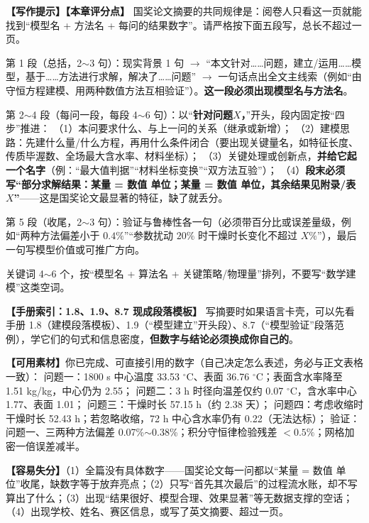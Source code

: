 \documentclass[12pt,a4paper]{article}
\newcommand{\prompt}[1]{\par\noindent\textbf{【写作提示】}#1\par}      %
\newcommand{\material}[1]{\par\noindent\textbf{【可用素材】}#1\par}    %
\newcommand{\pitfall}[1]{\par\noindent\textbf{【容易失分】}#1\par}     %
\newcommand{\handbook}[2]{\par\noindent\textbf{【手册索引：#1】} #2\par}
\begin{document}
\prompt{\textbf{【本章评分点】} 国奖论文摘要的共同规律是：阅卷人只看这一页就能找到“模型名 + 方法名 + 每问的结果数字”。请严格按下面五段写，总长不超过一页。

第 1 段（总括，2$\sim$3 句）：现实背景 1 句 $\rightarrow$ “本文针对……问题，建立/运用……模型，基于……方法进行求解，解决了……问题” $\rightarrow$ 一句话点出全文主线索（例如“由守恒方程建模、用两种数值方法互相验证”）。\textbf{这一段必须出现模型名与方法名}。

第 2$\sim$4 段（每问一段，每段 4$\sim$6 句）：以“\textbf{针对问题$X$，}”开头，段内固定按“四步”推进：
（1）本问要求什么、与上一问的关系（继承或新增）；
（2）建模思路：先建什么量/什么方程，再用什么条件闭合（要出现关键量名，如特征长度、传质毕渥数、全场最大含水率、材料坐标）；
（3）关键处理或创新点，\textbf{并给它起一个名字}（例：“最大值判据”“材料坐标变换”“双方法互验”）；
（4）\textbf{段末必须写“部分求解结果：某量 = 数值 单位；某量 = 数值 单位，其余结果见附录/表 $X$”}——这是国奖论文最显著的特征，缺了就丢分。

第 5 段（收尾，2$\sim$3 句）：验证与鲁棒性各一句（必须带百分比或误差量级，例如“两种方法偏差小于 $0.4\%$”“参数扰动 $20\%$ 时干燥时长变化不超过 $X\%$”），最后一句写模型价值或可推广方向。

关键词 4$\sim$6 个，按“模型名 + 算法名 + 关键策略/物理量”排列，不要写“数学建模”这类空词。}

\handbook{1.8、1.9、8.7 现成段落模板}{写摘要时如果语言卡壳，可以先看手册 1.8（建模段落模板）、1.9（“模型建立”开头段）、8.7（“模型验证”段落范例），学它们的句式和信息密度，\textbf{但数字与结论必须换成你自己的}。}

\material{你已完成、可直接引用的数字（自己决定怎么表述，务必与正文表格一致）：
问题一：1800 s 中心温度 33.53 $^\circ$C、表面 36.76 $^\circ$C；表面含水率降至 1.51 kg/kg，中心仍为 2.55；
问题二：3 h 时径向温差仅约 0.07 $^\circ$C，含水率中心 1.77、表面 1.01；
问题三：干燥时长 57.15 h（约 2.38 天）；
问题四：考虑收缩时干燥时长 52.43 h；若忽略收缩，72 h 中心含水率仍有 0.22（无法达标）；
验证：问题一、三两种方法偏差 0.07\%$\sim$0.38\%；积分守恒律检验残差 $<0.5\%$；网格加密一倍误差减半。}

\pitfall{（1）全篇没有具体数字——国奖论文每一问都以“某量 = 数值 单位”收尾，缺数字等于放弃亮点；（2）只写“首先其次最后”的过程流水账，却不写算出了什么；（3）出现“结果很好、模型合理、效果显著”等无数据支撑的空话；（4）出现学校、姓名、赛区信息，或写了英文摘要、超过一页。}

\end{document}
